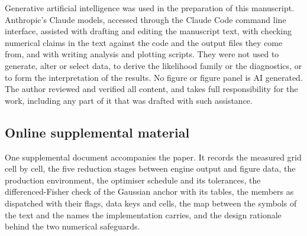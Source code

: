 %
%
Generative artificial intelligence was used in the preparation of this manuscript. Anthropic's
Claude models, accessed through the Claude Code command line interface, assisted with drafting and
editing the manuscript text, with checking numerical claims in the text against the code and the
output files they come from, and with writing analysis and plotting scripts. They were not used to
generate, alter or select data, to derive the likelihood family or the diagnostics, or to form the
interpretation of the results. No figure or figure panel is AI generated. The author reviewed and
verified all content, and takes full responsibility for the work, including any part of it that
was drafted with such assistance.

\subsection*{Online supplemental material}
One supplemental document accompanies the paper. It records the measured grid cell by cell, the
five reduction stages between engine output and figure data, the production environment, the
optimiser schedule and its tolerances, the differenced-Fisher check of the Gaussian anchor with
its tables, the members as dispatched with their flags, data keys and cells, the map between the
symbols of the text and the names the implementation carries, and the design rationale behind the
two numerical safeguards.
